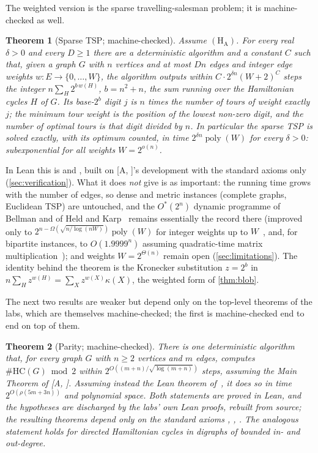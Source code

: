 \documentclass[11pt]{amsart}
\theoremstyle{plain}
\newtheorem{theorem}{Theorem}[section]
\theoremstyle{definition}
\theoremstyle{remark}
\numberwithin{equation}{section}
\newcommand{\HC}{\#\mathrm{HC}}
\newcommand{\poly}{\operatorname{poly}}
\newcommand{\A}[1][]{\textup{[A\if\relax\detokenize{#1}\relax\else, #1\fi]}}
\begin{document}
The weighted version is the sparse travelling-salesman problem; it is machine-checked as well.

\begin{theorem}[Sparse TSP; machine-checked]\label{thm:tsp}
Assume $(\mathrm{H}_{\mathrm{A}})$. For every real $\delta>0$ and every $D\ge1$ there are a
deterministic algorithm and a constant $C$ such that, given a graph $G$ with $n$ vertices and at
most $Dn$ edges and integer edge weights $w\colon E\to\{0,\dots,W\}$, the algorithm outputs within
$C\cdot 2^{\delta n}(W+2)^C$ steps the integer $n\sum_{H}2^{b\,w(H)}$, $b=n^2+n$, the sum running
over the Hamiltonian cycles $H$ of $G$. Its base-$2^{b}$ digit $j$ is $n$ times the number of
tours of weight exactly $j$; the minimum tour weight is the position of the lowest non-zero
digit, and the number of optimal tours is that digit divided by $n$. In particular the sparse TSP
is solved exactly, with its optimum counted, in time $2^{\delta n}\poly(W)$ for every
$\delta>0$: subexponential for all weights $W=2^{o(n)}$.
\end{theorem}

In Lean this is  and , built on \A's development with
the standard axioms only (\cref{sec:verification}). What it does \emph{not} give is as
important: the running time grows with the number of edges, so dense and metric instances
(complete graphs, Euclidean TSP) are untouched, and the $O^*(2^n)$ dynamic programme of
Bellman and of Held and Karp~\cite{Bellman62,HeldKarp62} remains essentially the record there
(improved only to $2^{n-\Omega(\sqrt{n/\log(nW)})}\poly(W)$ for integer weights up to
$W$~\cite{Bjorklund16}, and, for bipartite instances, to $O(1.9999^n)$ assuming quadratic-time
matrix multiplication~\cite{Nederlof20});
and weights $W=2^{\Theta(n)}$ remain open (\cref{sec:limitations}). The identity behind the
theorem is the Kronecker substitution $z=2^{b}$ in $n\sum_Hz^{w(H)}=\sum_Xz^{w(X)}\kappa(X)$,
the weighted form of \cref{thm:blob}.

The next two results are weaker but depend only on the top-level theorems of the labs, which
are themselves machine-checked; the first is machine-checked end to end on top of them.

\begin{theorem}[Parity; machine-checked]\label{thm:parity}
There is one deterministic algorithm that, for every graph $G$ with $n\ge2$ vertices and $m$
edges, computes $\HC(G)\bmod 2$ within $2^{O((m+n)/\sqrt{\log(m+n)})}$ steps, assuming the Main
Theorem of \A. Assuming instead the Lean theorem of~\cite{OpenAI26}, it does so in time
$2^{O(\rho(5m+3n))}$ and polynomial space. Both statements are proved in Lean, and the
hypotheses are discharged by the labs' own Lean proofs, rebuilt from source; the resulting
theorems depend only on the standard axioms , ,
. The analogous statement holds for directed Hamiltonian cycles in digraphs of
bounded in- and out-degree.
\end{theorem}
\end{document}

